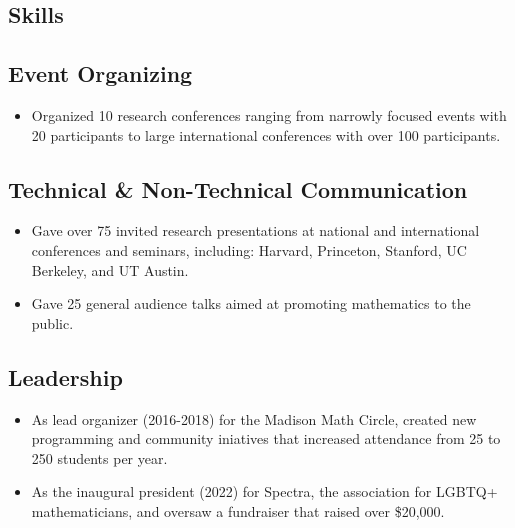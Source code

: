 \documentclass[
	10pt, %
]{FreemanCV}
\begin{document}
\begin{paracol}{2}

\section{Skills}

\subsection{Event Organizing}

\begin{itemize}[leftmargin=*]
\item Organized 10 research conferences ranging from narrowly focused events with 20 participants to large international conferences with over 100 participants.
\end{itemize}

\subsection{Technical \& Non-Technical Communication}

\begin{itemize}[leftmargin=*]
\item Gave over 75 invited research presentations at national and international conferences and seminars, including: Harvard, Princeton, Stanford, UC Berkeley, and UT Austin. \vspace{-.4em}
\item Gave 25 general audience talks aimed at promoting mathematics to the public. 
\end{itemize}

\subsection{Leadership}

\begin{itemize}[leftmargin=*]
\item As lead organizer (2016-2018) for the Madison Math Circle, created new programming and community iniatives that increased attendance from 25 to 250 students per year. 
 \vspace{-.4em}
\item As the inaugural president (2022) for Spectra, the association for LGBTQ+ mathematicians, and oversaw a fundraiser that raised over \$20,000. 
\end{itemize}


\end{paracol}
\end{document}

